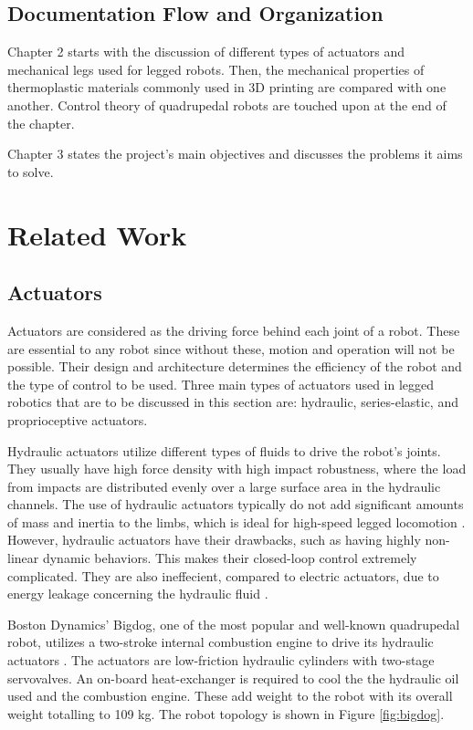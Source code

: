 \documentclass[english]{upeeei}
\begin{document}
\section{Documentation Flow and Organization}

Chapter 2 starts with the discussion of different types of actuators and mechanical legs used for legged robots. Then, the mechanical properties of thermoplastic materials commonly used in 3D printing are compared with one another. Control theory of quadrupedal robots are touched upon at the end of the chapter.

Chapter 3 states the project's main objectives and discusses the problems it aims to solve.

\cleardoublepage{}

\chapter{Related Work\label{cha:RRW}}

\section{Actuators}

Actuators are considered as the driving force behind each joint of a robot. These are essential to any robot since without these, motion and operation will not be possible. Their design and architecture determines the efficiency of the robot and the type of control to be used. Three main types of actuators used in legged robotics that are to be discussed in this section are: hydraulic, series-elastic, and proprioceptive actuators.

Hydraulic actuators utilize different types of fluids to drive the robot's joints. They usually have high force density with high impact robustness, where the load from impacts are distributed evenly over a large surface area in the hydraulic channels. The use of hydraulic actuators typically do not add significant amounts of mass and inertia to the limbs, which is ideal for high-speed legged locomotion \cite{minicheetah}. However, hydraulic actuators have their drawbacks, such as having highly non-linear dynamic behaviors. This makes their closed-loop control extremely complicated. They are also ineffecient, compared to electric actuators, due to energy leakage concerning the hydraulic fluid \cite{controlhydraulic}.

Boston Dynamics' Bigdog, one of the most popular and well-known quadrupedal robot, utilizes a two-stroke internal combustion engine to drive its hydraulic actuators \cite{bigdog}. The actuators are low-friction hydraulic cylinders with two-stage servovalves. An on-board heat-exchanger is required to cool the the hydraulic oil used and the combustion engine. These add weight to the robot with its overall weight totalling to 109 kg. The robot topology is shown in Figure \ref{fig:bigdog}.
\end{document}
